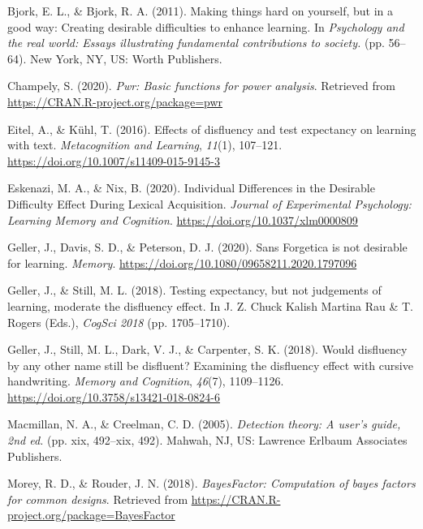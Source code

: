 \documentclass[
  english,
  man]{apa6}
\begin{document}
\leavevmode\hypertarget{ref-Bjork2011}{}%
Bjork, E. L., \& Bjork, R. A. (2011). Making things hard on yourself, but in a good way: Creating desirable difficulties to enhance learning. In \emph{Psychology and the real world: Essays illustrating fundamental contributions to society.} (pp. 56--64). New York, NY, US: Worth Publishers.

\leavevmode\hypertarget{ref-Champely2020}{}%
Champely, S. (2020). \emph{Pwr: Basic functions for power analysis}. Retrieved from \url{https://CRAN.R-project.org/package=pwr}

\leavevmode\hypertarget{ref-Eitel2016}{}%
Eitel, A., \& Kühl, T. (2016). Effects of disfluency and test expectancy on learning with text. \emph{Metacognition and Learning}, \emph{11}(1), 107--121. \url{https://doi.org/10.1007/s11409-015-9145-3}

\leavevmode\hypertarget{ref-Eskenazi2020}{}%
Eskenazi, M. A., \& Nix, B. (2020). Individual Differences in the Desirable Difficulty Effect During Lexical Acquisition. \emph{Journal of Experimental Psychology: Learning Memory and Cognition}. \url{https://doi.org/10.1037/xlm0000809}

\leavevmode\hypertarget{ref-Geller2020}{}%
Geller, J., Davis, S. D., \& Peterson, D. J. (2020). Sans Forgetica is not desirable for learning. \emph{Memory}. \url{https://doi.org/10.1080/09658211.2020.1797096}

\leavevmode\hypertarget{ref-cogsci18-Geller}{}%
Geller, J., \& Still, M. L. (2018). Testing expectancy, but not judgements of learning, moderate the disfluency effect. In J. Z. Chuck Kalish Martina Rau \& T. Rogers (Eds.), \emph{CogSci 2018} (pp. 1705--1710).

\leavevmode\hypertarget{ref-Geller2018}{}%
Geller, J., Still, M. L., Dark, V. J., \& Carpenter, S. K. (2018). Would disfluency by any other name still be disfluent? Examining the disfluency effect with cursive handwriting. \emph{Memory and Cognition}, \emph{46}(7), 1109--1126. \url{https://doi.org/10.3758/s13421-018-0824-6}

\leavevmode\hypertarget{ref-Macmillan2005}{}%
Macmillan, N. A., \& Creelman, C. D. (2005). \emph{Detection theory: A user's guide, 2nd ed.} (pp. xix, 492--xix, 492). Mahwah, NJ, US: Lawrence Erlbaum Associates Publishers.

\leavevmode\hypertarget{ref-Morey2018}{}%
Morey, R. D., \& Rouder, J. N. (2018). \emph{BayesFactor: Computation of bayes factors for common designs}. Retrieved from \url{https://CRAN.R-project.org/package=BayesFactor}
\end{document}
